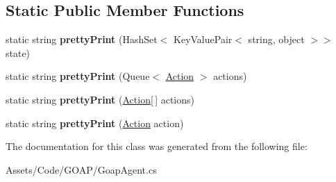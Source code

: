 \subsection*{Static Public Member Functions}
\begin{DoxyCompactItemize}
\item 
\hypertarget{class_goap_agent_a0200bfe84bbe6a5a3672ce943f4af41d}{}static string {\bfseries pretty\+Print} (Hash\+Set$<$ Key\+Value\+Pair$<$ string, object $>$$>$ state)\label{class_goap_agent_a0200bfe84bbe6a5a3672ce943f4af41d}

\item 
\hypertarget{class_goap_agent_a5133fa0a86b32b74a3c69a5f2cf4228b}{}static string {\bfseries pretty\+Print} (Queue$<$ \hyperlink{class_action}{Action} $>$ actions)\label{class_goap_agent_a5133fa0a86b32b74a3c69a5f2cf4228b}

\item 
\hypertarget{class_goap_agent_a05b17d6afd2c0e8291d9bfb2397293cd}{}static string {\bfseries pretty\+Print} (\hyperlink{class_action}{Action}\mbox{[}$\,$\mbox{]} actions)\label{class_goap_agent_a05b17d6afd2c0e8291d9bfb2397293cd}

\item 
\hypertarget{class_goap_agent_ab3bbb156561be37c7fb6631652b843c6}{}static string {\bfseries pretty\+Print} (\hyperlink{class_action}{Action} action)\label{class_goap_agent_ab3bbb156561be37c7fb6631652b843c6}

\end{DoxyCompactItemize}


The documentation for this class was generated from the following file\+:\begin{DoxyCompactItemize}
\item 
Assets/\+Code/\+G\+O\+A\+P/Goap\+Agent.\+cs\end{DoxyCompactItemize}
